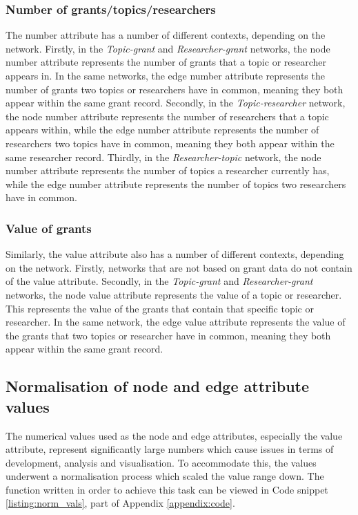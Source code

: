 \subsubsection{Number of grants/topics/researchers}

The number attribute has a number of different contexts, depending on the network. Firstly, in the \textit{Topic-grant} and \textit{Researcher-grant} networks, the node number attribute represents the number of grants that a topic or researcher appears in. In the same networks, the edge number attribute represents the number of grants two topics or researchers have in common, meaning they both appear within the same grant record. Secondly, in the \textit{Topic-researcher} network, the node number attribute represents the number of researchers that a topic appears within, while the edge number attribute represents the number of researchers two topics have in common, meaning they both appear within the same researcher record. Thirdly, in the \textit{Researcher-topic} network, the node number attribute represents the number of topics a researcher currently has, while the edge number attribute represents the number of topics two researchers have in common.

\subsubsection{Value of grants}

Similarly, the value attribute also has a number of different contexts, depending on the network. Firstly, networks that are not based on grant data do not contain of the value attribute. Secondly, in the \textit{Topic-grant} and \textit{Researcher-grant} networks, the node value attribute represents the value of a topic or researcher. This represents the value of the grants that contain that specific topic or researcher. In the same network, the edge value attribute represents the value of the grants that two topics or researcher have in common, meaning they both appear within the same grant record.

\subsection{Normalisation of node and edge attribute values}

The numerical values used as the node and edge attributes, especially the value attribute, represent significantly large numbers which cause issues in terms of development, analysis and visualisation. To accommodate this, the values underwent a normalisation process which scaled the value range down. 
The function written in order to achieve this task can be viewed in Code snippet \ref{listing:norm_vals}, part of Appendix \ref{appendix:code}.

